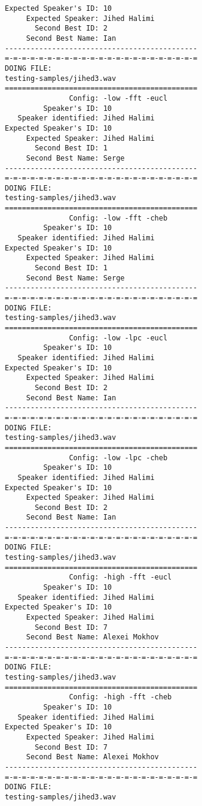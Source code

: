 \begin{verbatim}
Expected Speaker's ID: 10
     Expected Speaker: Jihed Halimi
       Second Best ID: 2
     Second Best Name: Ian
---------------------------------------------
=-=-=-=-=-=-=-=-=-=-=-=-=-=-=-=-=-=-=-=-=-=-=
DOING FILE:
testing-samples/jihed3.wav
=============================================
               Config: -low -fft -eucl
         Speaker's ID: 10
   Speaker identified: Jihed Halimi
Expected Speaker's ID: 10
     Expected Speaker: Jihed Halimi
       Second Best ID: 1
     Second Best Name: Serge
---------------------------------------------
=-=-=-=-=-=-=-=-=-=-=-=-=-=-=-=-=-=-=-=-=-=-=
DOING FILE:
testing-samples/jihed3.wav
=============================================
               Config: -low -fft -cheb
         Speaker's ID: 10
   Speaker identified: Jihed Halimi
Expected Speaker's ID: 10
     Expected Speaker: Jihed Halimi
       Second Best ID: 1
     Second Best Name: Serge
---------------------------------------------
=-=-=-=-=-=-=-=-=-=-=-=-=-=-=-=-=-=-=-=-=-=-=
DOING FILE:
testing-samples/jihed3.wav
=============================================
               Config: -low -lpc -eucl
         Speaker's ID: 10
   Speaker identified: Jihed Halimi
Expected Speaker's ID: 10
     Expected Speaker: Jihed Halimi
       Second Best ID: 2
     Second Best Name: Ian
---------------------------------------------
=-=-=-=-=-=-=-=-=-=-=-=-=-=-=-=-=-=-=-=-=-=-=
DOING FILE:
testing-samples/jihed3.wav
=============================================
               Config: -low -lpc -cheb
         Speaker's ID: 10
   Speaker identified: Jihed Halimi
Expected Speaker's ID: 10
     Expected Speaker: Jihed Halimi
       Second Best ID: 2
     Second Best Name: Ian
---------------------------------------------
=-=-=-=-=-=-=-=-=-=-=-=-=-=-=-=-=-=-=-=-=-=-=
DOING FILE:
testing-samples/jihed3.wav
=============================================
               Config: -high -fft -eucl
         Speaker's ID: 10
   Speaker identified: Jihed Halimi
Expected Speaker's ID: 10
     Expected Speaker: Jihed Halimi
       Second Best ID: 7
     Second Best Name: Alexei Mokhov
---------------------------------------------
=-=-=-=-=-=-=-=-=-=-=-=-=-=-=-=-=-=-=-=-=-=-=
DOING FILE:
testing-samples/jihed3.wav
=============================================
               Config: -high -fft -cheb
         Speaker's ID: 10
   Speaker identified: Jihed Halimi
Expected Speaker's ID: 10
     Expected Speaker: Jihed Halimi
       Second Best ID: 7
     Second Best Name: Alexei Mokhov
---------------------------------------------
=-=-=-=-=-=-=-=-=-=-=-=-=-=-=-=-=-=-=-=-=-=-=
DOING FILE:
testing-samples/jihed3.wav

\end{verbatim}
